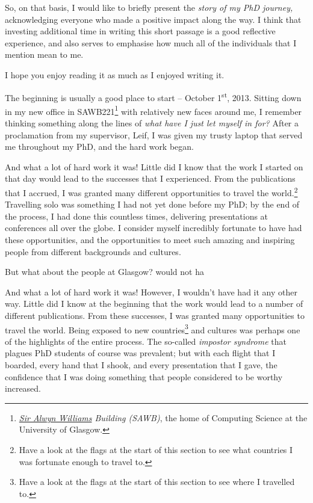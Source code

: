 \begin{preamble}
So, on that basis, I would like to briefly present the \emph{story of my PhD journey,} acknowledging everyone who made a positive impact along the way. I think that investing additional time in writing this short passage is a good reflective experience, and also serves to emphasise how much all of the individuals that I mention mean to me.

I hope you enjoy reading it as much as I enjoyed writing it.

\acksep

The beginning is usually a good place to start -- October 1\textsuperscript{st}, 2013. Sitting down in my new office in SAWB221\footnote{\emph{\href{https://en.wikipedia.org/wiki/Alwyn_Williams_(geologist)}{Sir Alwyn Williams} Building (SAWB)}, the home of Computing Science at the University of Glasgow.} with relatively new faces around me, I remember thinking something along the lines of \emph{what have I just let myself in for?} After a proclamation from my supervisor, Leif, I was given my trusty laptop that served me throughout my PhD, and the hard work began.

And what a lot of hard work it was! Little did I know that the work I started on that day would lead to the successes that I experienced. From the publications that I accrued, I was granted many different opportunities to travel the world.\footnote{Have a look at the flags at the start of this section to see what countries I was fortunate enough to travel to.} Travelling solo was something I had not yet done before my PhD; by the end of the process, I had done this countless times, delivering presentations at conferences all over the globe. I consider myself incredibly fortunate to have had these opportunities, and the opportunities to meet such amazing and inspiring people from different backgrounds and cultures.

But what about the people at Glasgow?  would not ha


\todo{====}


And what a lot of hard work it was! However, I wouldn't have had it any other way. Little did I know at the beginning that the work would lead to a number of different publications. From these successes, I was granted many opportunities to travel the world. Being exposed to new countries\footnote{Have a look at the flags at the start of this section to see where I travelled to.} and cultures was perhaps one of the highlights of the entire process. The so-called \emph{impostor syndrome} that plagues PhD students of course was prevalent; but with each flight that I boarded, every hand that I shook, and every presentation that I gave, the confidence that I was doing something that people considered to be worthy increased.





\end{preamble}
